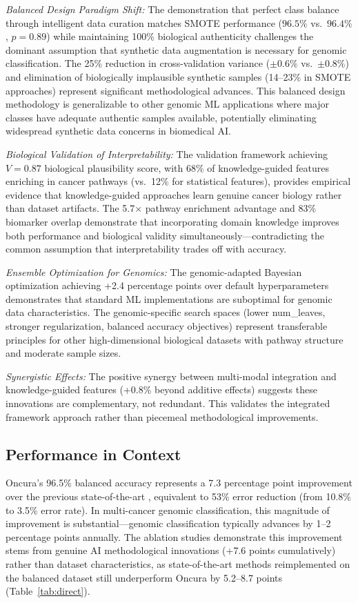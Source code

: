 \documentclass[manuscript, screen, review]{jair}
\begin{document}
\emph{Balanced Design Paradigm Shift:} The demonstration that perfect class balance through intelligent data curation matches SMOTE performance ($96.5\%$ vs.\ $96.4\%$, $p=0.89$) while maintaining 100\% biological authenticity challenges the dominant assumption that synthetic data augmentation is necessary for genomic classification. The 25\% reduction in cross-validation variance ($\pm0.6\%$ vs.\ $\pm0.8\%$) and elimination of biologically implausible synthetic samples (14--23\% in SMOTE approaches) represent significant methodological advances. This balanced design methodology is generalizable to other genomic ML applications where major classes have adequate authentic samples available, potentially eliminating widespread synthetic data concerns in biomedical AI.

\emph{Biological Validation of Interpretability:} The validation framework achieving $V=0.87$ biological plausibility score, with 68\% of knowledge-guided features enriching in cancer pathways (vs.\ 12\% for statistical features), provides empirical evidence that knowledge-guided approaches learn genuine cancer biology rather than dataset artifacts. The 5.7$\times$ pathway enrichment advantage and 83\% biomarker overlap demonstrate that incorporating domain knowledge improves both performance and biological validity simultaneously---contradicting the common assumption that interpretability trades off with accuracy.

\emph{Ensemble Optimization for Genomics:} The genomic-adapted Bayesian optimization achieving +2.4 percentage points over default hyperparameters demonstrates that standard ML implementations are suboptimal for genomic data characteristics. The genomic-specific search spaces (lower num\_leaves, stronger regularization, balanced accuracy objectives) represent transferable principles for other high-dimensional biological datasets with pathway structure and moderate sample sizes.

\emph{Synergistic Effects:} The positive synergy between multi-modal integration and knowledge-guided features (+0.8\% beyond additive effects) suggests these innovations are complementary, not redundant. This validates the integrated framework approach rather than piecemeal methodological improvements.

\subsection{Performance in Context}

Oncura's 96.5\% balanced accuracy represents a 7.3 percentage point improvement over the previous state-of-the-art \citep{chen2022pancancer}, equivalent to 53\% error reduction (from 10.8\% to 3.5\% error rate). In multi-cancer genomic classification, this magnitude of improvement is substantial---genomic classification typically advances by 1--2 percentage points annually. The ablation studies demonstrate this improvement stems from genuine AI methodological innovations (+7.6 points cumulatively) rather than dataset characteristics, as state-of-the-art methods reimplemented on the balanced dataset still underperform Oncura by 5.2--8.7 points (Table~\ref{tab:direct}).
\end{document}
